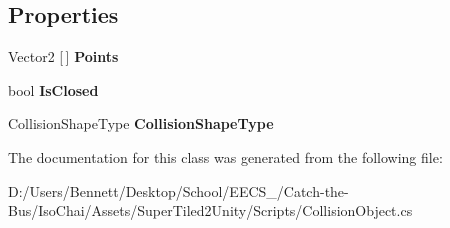 \subsection*{Properties}
\begin{DoxyCompactItemize}
\item 
\mbox{\label{class_super_tiled2_unity_1_1_collision_object_a194da0ed5ec0be40faf39bc343f94485}} 
Vector2 \mbox{[}$\,$\mbox{]} {\bfseries Points}
\item 
\mbox{\label{class_super_tiled2_unity_1_1_collision_object_a9452a1c668d8d3cb27dfa2502c028efb}} 
bool {\bfseries Is\+Closed}
\item 
\mbox{\label{class_super_tiled2_unity_1_1_collision_object_a0d1cd8635e11c2f7886dbab9f71a5fa5}} 
Collision\+Shape\+Type {\bfseries Collision\+Shape\+Type}
\end{DoxyCompactItemize}


The documentation for this class was generated from the following file\+:\begin{DoxyCompactItemize}
\item 
D\+:/\+Users/\+Bennett/\+Desktop/\+School/\+E\+E\+C\+S\+\_/\+Catch-\/the-\/\+Bus/\+Iso\+Chai/\+Assets/\+Super\+Tiled2\+Unity/\+Scripts/Collision\+Object.\+cs\end{DoxyCompactItemize}
